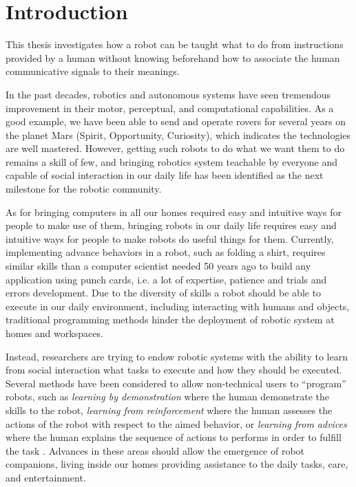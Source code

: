 
\chapter{Introduction}
\label{chapter:introduction}
\minitoc

This thesis investigates how a robot can be taught what to do from instructions provided by a human without knowing beforehand how to associate the human communicative signals to their meanings.

In the past decades, robotics and autonomous systems have seen tremendous improvement in their motor, perceptual, and computational capabilities. As a good example, we have been able to send and operate rovers for several years on the planet Mars (Spirit, Opportunity, Curiosity), which indicates the technologies are well mastered. However, getting such robots to do what we want them to do remains a skill of few, and bringing robotics system teachable by everyone and capable of social interaction in our daily life has been identified as the next milestone for the robotic community.

As for bringing computers in all our homes required easy and intuitive ways for people to make use of them, bringing robots in our daily life requires easy and intuitive ways for people to make robots do useful things for them. Currently, implementing advance behaviors in a robot, such as folding a shirt, requires similar skills than a computer scientist needed 50 years ago to build any application using punch cards, i.e. a lot of expertise, patience and trials and errors development. Due to the diversity of skills a robot should be able to execute in our daily environment, including interacting with humans and objects, traditional programming methods hinder the deployment of robotic system at homes and workspaces.

Instead, researchers are trying to endow robotic systems with the ability to learn from social interaction what tasks to execute and how they should be executed. Several methods have been considered to allow non-technical users to ``program'' robots, such as \emph{learning by demonstration} where the human demonstrate the skills to the robot, \emph{learning from reinforcement} where the human assesses the actions of the robot with respect to the aimed behavior, or \emph{learning from advices} where the human explains the sequence of actions to performs in order to fulfill the task . Advances in these areas should allow the emergence of robot companions, living inside our homes providing assistance to the daily tasks, care, and entertainment. 

